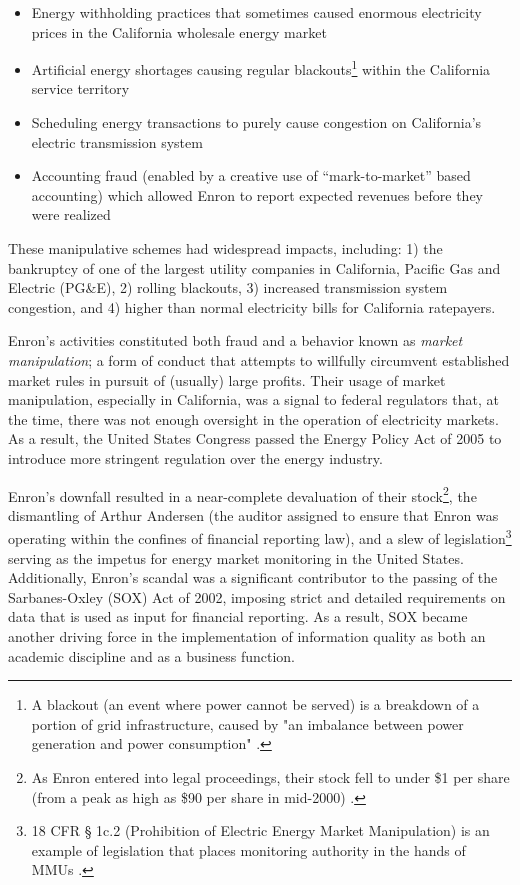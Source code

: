 \begin{itemize}
    \item{Energy withholding practices that sometimes caused enormous electricity prices in the California wholesale energy market}
    \item{Artificial energy shortages causing regular blackouts\footnote{A blackout (an event where power cannot be served) is a breakdown of a portion of grid infrastructure, caused by "an imbalance between power generation and power consumption" \cite{nerc1}.} within the California service territory}
    \item{Scheduling energy transactions to purely cause congestion on California's electric transmission system}
    \item{Accounting fraud (enabled by a creative use of “mark-to-market” based accounting) which allowed Enron to report expected revenues before they were realized}
\end{itemize}

These manipulative schemes had widespread impacts, including: 1) the bankruptcy of one of the largest utility companies in California, Pacific Gas and Electric (PG\&E), 2) rolling blackouts, 3) increased transmission system congestion, and 4) higher than normal electricity bills for California ratepayers.

Enron’s activities constituted both fraud and a behavior known as \textit{market manipulation}; a form of conduct that attempts to willfully circumvent established market rules in pursuit of (usually) large profits. Their usage of market manipulation, especially in California, was a signal to federal regulators that, at the time, there was not enough oversight in the operation of electricity markets. As a result, the United States Congress passed the Energy Policy Act of 2005 to introduce more stringent regulation over the energy industry.

Enron’s downfall resulted in a near-complete devaluation of their stock\footnote{As Enron entered into legal proceedings, their stock fell to under \$1 per share (from a peak as high as \$90 per share in mid-2000) \cite{enron-stock-chart}. }, the dismantling of Arthur Andersen (the auditor assigned to ensure that Enron was operating within the confines of financial reporting law), and a slew of legislation\footnote{18 CFR § 1c.2 (Prohibition of Electric Energy Market Manipulation) is an example of legislation that places monitoring authority in the hands of MMUs \cite{ecfr1}.} 
serving as the impetus for energy market monitoring in the United States. Additionally, Enron’s scandal was a significant contributor to the passing of the Sarbanes-Oxley (SOX) Act of 2002, imposing strict and detailed requirements on data that is used as input for financial reporting. As a result, SOX became another driving force in the implementation of information quality as both an academic discipline and as a business function.

